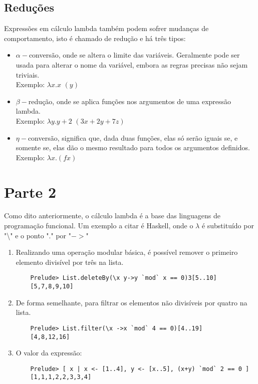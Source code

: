 \documentclass{article}
\begin{document}
\newpage
\subsection*{Reduções}
Expressões em cálculo lambda também podem sofrer mudanças de comportamento,
isto é chamado de redução e há três tipos:
    \begin{itemize}
        \item $\alpha-$conversão, onde se altera o limite das variáveis.
            Geralmente pode ser usada para alterar o nome da variável, embora
            as regras precisas não sejam triviais. \\
        Exemplo: $\lambda x.x$ $(y)$
        \item $\beta-$redução, onde se aplica funções nos argumentos de uma
            expressão lambda. \\ 
        Exemplo: $\lambda y.y +2$ $(3x+2y+7z)$
        \item $\eta-$conversão, significa que, dada duas funções, elas só serão
            iguais se, e somente se, elas dão o mesmo resultado para todos os
            argumentos definidos. \\
        Exemplo: $\lambda x.(f x)$
    \end{itemize}
    
\section*{Parte 2}
Como dito anteriormente, o cálculo lambda é a base das linguagens de
programação funcional. Um exemplo a citar é Haskell, onde o $\lambda$ é
substituído por "\textbackslash" e o ponto "." por "$->$"
\begin{enumerate}
    \item Realizando uma operação modular básica, é possível remover o primeiro
        elemento divisível por três na lista.
    \begin{verbatim}
    Prelude> List.deleteBy(\x y->y `mod` x == 0)3[5..10]
    [5,7,8,9,10]
    \end{verbatim}
    \item De forma semelhante, para filtrar os elementos não divisíveis por
        quatro na lista.
    \begin{verbatim}
    Prelude> List.filter(\x ->x `mod` 4 == 0)[4..19]
    [4,8,12,16]
    \end{verbatim}
    \item O valor da expressão:
    \begin{verbatim}
    Prelude> [ x | x <- [1..4], y <- [x..5], (x+y) `mod` 2 == 0 ]
    [1,1,1,2,2,3,3,4]
    \end{verbatim}
\end{enumerate}
\end{document}
